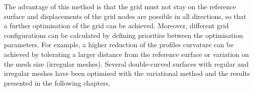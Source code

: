 The advantage of this method is that the grid must not stay on the reference surface and displacements of the grid nodes are possible in all directions, so that a further optimisation of the grid can be achieved. Moreover, different grid configurations can be calculated by defining priorities between the optimisation parameters. For example, a higher reduction of the profiles curvature can be achieved by tolerating a larger distance from the reference surface or variation on the mesh size (irregular meshes). Several double-curved surfaces with regular and irregular meshes have been optimised with the variational method and the results presented in the following chapters.

\bigskip

